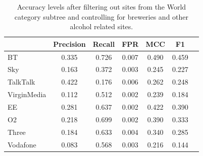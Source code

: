 \documentclass{bmcart}
\begin{document}
\begin{table}[h!]
\caption{Accuracy levels after filtering out sites from the World category subtree and controlling for breweries and other alcohol related sites.}
  \begin{tabular}{ l c c c c c c}
    \hline
     & Precision & Recall & FPR & MCC & F1 \\
    \hline
	BT & 0.335 & 0.726 & 0.007 & 0.490 & 0.459 \\
    Sky & 0.163 & 0.372 & 0.003 & 0.245 & 0.227 \\
    TalkTalk & 0.422 & 0.176 & 0.006 & 0.262 & 0.248 \\
	VirginMedia & 0.112 & 0.512 & 0.002 & 0.239 & 0.184 \\
	\hline    
	EE & 0.281 & 0.637 & 0.002 & 0.422 & 0.390 \\
	O2 & 0.218 & 0.699 & 0.002 & 0.390 & 0.333 \\
	Three & 0.184 & 0.633 & 0.004 & 0.340 & 0.285 \\
	Vodafone & 0.083 & 0.568 & 0.003 & 0.216 & 0.144 \\
    \hline
  \end{tabular}
\end{table}

\end{document}
